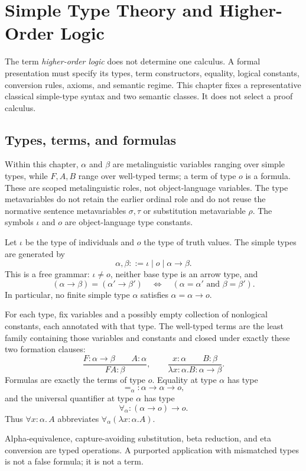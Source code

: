\chapter[Simple Type Theory]{Simple Type Theory and Higher-Order Logic}
\label{ch:simple-type-theory}

The term \emph{higher-order logic} does not determine one calculus.  A formal
presentation must specify its types, term constructors, equality, logical
constants, conversion rules, axioms, and semantic regime.  This chapter fixes
a representative classical simple-type syntax and two semantic classes.  It
does not select a proof calculus.

\section{Types, terms, and formulas}
\label{sec:simple-type-theory-01}

Within this chapter, \(\alpha\) and \(\beta\) are metalinguistic variables
ranging over simple types, while \(F,A,B\) range over well-typed terms; a term
of type \(o\) is a formula.  These are scoped metalinguistic roles, not
object-language variables.  The type metavariables do not retain the earlier
ordinal role and do not reuse the normative sentence metavariables
\(\sigma,\tau\) or substitution metavariable \(\rho\).  The symbols \(\iota\)
and \(o\) are object-language type constants.

\begin{definition}
Let \(\iota\) be the type of individuals and \(o\) the type of truth values.
The simple types are generated by
\[
  \alpha,\beta::=\iota\mid o\mid\alpha\to\beta.
\]
This is a free grammar: \(\iota\ne o\), neither base type is an arrow type,
and
\[
  (\alpha\to\beta)=(\alpha'\to\beta')
  \quad\Longleftrightarrow\quad
  (\alpha=\alpha'\text{ and }\beta=\beta').
\]
In particular, no finite simple type \(\alpha\) satisfies
\(\alpha=\alpha\to o\).
\end{definition}

For each type, fix variables and a possibly empty collection of nonlogical
constants, each annotated with that type.  The well-typed terms are the least
family containing those variables and constants and closed under exactly these
two formation clauses:
\[
  \frac{F:\alpha\to\beta\qquad A:\alpha}{FA:\beta},
  \qquad
  \frac{x:\alpha\qquad B:\beta}
       {\lambda x{:}\alpha.B:\alpha\to\beta}.
\]
Formulas are exactly the terms of type \(o\).
Equality at type \(\alpha\) has type
\[
  =_\alpha:\alpha\to\alpha\to o,
\]
and the universal quantifier at type \(\alpha\) has type
\[
  \forall_\alpha:(\alpha\to o)\to o.
\]
Thus \(\forall x{:}\alpha.\,A\) abbreviates
\(\forall_\alpha(\lambda x{:}\alpha.A)\).

Alpha-equivalence, capture-avoiding substitution, beta reduction, and eta
conversion are typed operations.  A purported application with mismatched
types is not a false formula; it is not a term.

